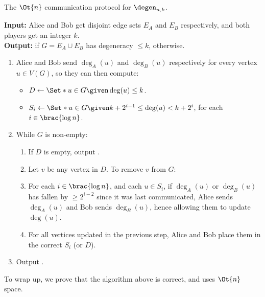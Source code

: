 \begin{Algorithm}\label{alg:n}
  The $\Ot{n}$ communication protocol for $\degen_{n, k}$. \medskip

  \textbf{Input:} Alice and Bob get disjoint edge sets $E_A$ and $E_B$
  respectively, and both players get an integer $k$.\\
  \textbf{Output:} \true{} if $G = E_A \cup E_B$ has degeneracy $\leq k$, \fail{} otherwise.
  \begin{enumerate}
    \item Alice and Bob send $\deg_A(u)$ and $\deg_B(u)$ respectively for every
      vertex $u \in V(G)$, so they can then compute:
      \begin{itemize}
        \item $D \gets \Set*{ u \in G \given \deg(u) \leq k }$.
        \item $S_i \gets \Set*{ u \in G \given k + 2^{i - 1} \leq \deg(u) < k + 2^i }$,
          for each $i \in \brac{\log n}$.
      \end{itemize}
    \item While {$G$ is non-empty:}
      \begin{enumerate}

        \item If $D$ is empty, output \fail.
        \item Let $v$ be any vertex in $D$. To remove $v$ from $G$:
        \item For each $i \in \brac{ \log n }$, and each $u \in S_i$,
          if $\deg_A(u)$ or $\deg_B(u)$ has fallen by $\geq 2^{i - 2}$ since it
          was last communicated, Alice sends $\deg_A(u)$ and Bob sends $\deg_B(u)$,
          hence allowing them to update $\deg(u)$.
        \item For all vertices updated in the previous step, Alice and Bob place
          them in the correct $S_i$ (or $D$).
      \end{enumerate}
    \item Output \true.
  \end{enumerate}
\end{Algorithm}

To wrap up, we prove that the algorithm above is correct, and uses $\Ot{n}$
space.

